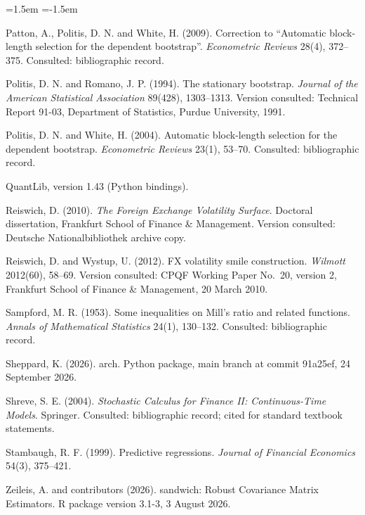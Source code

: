 \documentclass[11pt]{article}
\theoremstyle{result}
\begin{document}
\begin{list}{}{\leftmargin=1.5em \itemindent=-1.5em \itemsep=2pt \parsep=0pt}
\item Patton, A., Politis, D. N. and White, H. (2009). Correction to ``Automatic block-length selection for the dependent bootstrap''. \emph{Econometric Reviews} 28(4), 372--375. Consulted: bibliographic record.
\item Politis, D. N. and Romano, J. P. (1994). The stationary bootstrap. \emph{Journal of the American Statistical Association} 89(428), 1303--1313. Version consulted: Technical Report 91-03, Department of Statistics, Purdue University, 1991.
\item Politis, D. N. and White, H. (2004). Automatic block-length selection for the dependent bootstrap. \emph{Econometric Reviews} 23(1), 53--70. Consulted: bibliographic record.
\item QuantLib, version 1.43 (Python bindings).
\item Reiswich, D. (2010). \emph{The Foreign Exchange Volatility Surface}. Doctoral dissertation, Frankfurt School of Finance \& Management. Version consulted: Deutsche Nationalbibliothek archive copy.
\item Reiswich, D. and Wystup, U. (2012). FX volatility smile construction. \emph{Wilmott} 2012(60), 58--69. Version consulted: CPQF Working Paper No.~20, version 2, Frankfurt School of Finance \& Management, 20 March 2010.
\item Sampford, M. R. (1953). Some inequalities on Mill's ratio and related functions. \emph{Annals of Mathematical Statistics} 24(1), 130--132. Consulted: bibliographic record.
\item Sheppard, K. (2026). arch. Python package, main branch at commit 91a25ef, 24 September 2026.
\item Shreve, S. E. (2004). \emph{Stochastic Calculus for Finance II: Continuous-Time Models}. Springer. Consulted: bibliographic record; cited for standard textbook statements.
\item Stambaugh, R. F. (1999). Predictive regressions. \emph{Journal of Financial Economics} 54(3), 375--421.
\item Zeileis, A. and contributors (2026). sandwich: Robust Covariance Matrix Estimators. R package version 3.1-3, 3 August 2026.
\end{list}
\end{document}
